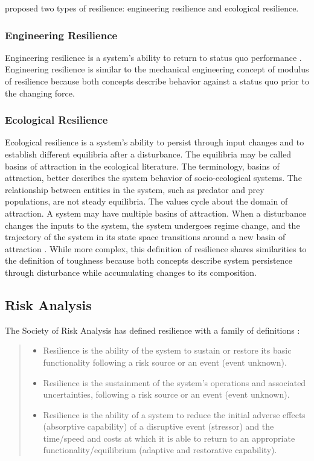\cite{Holling1973a} proposed two types of resilience: engineering
resilience and ecological resilience.

\subsubsection{Engineering Resilience}
Engineering resilience is a system's ability to return to status quo
performance \cite{Holling2010}. Engineering resilience is similar to
the mechanical engineering concept of modulus of resilience because
both concepts describe behavior against a status quo prior to the
changing force.

\subsubsection{Ecological Resilience}
Ecological resilience is a system's ability to persist through input
changes and to establish different equilibria after a disturbance. The
equilibria may be called basins of attraction in the ecological
literature. The terminology, basins of attraction, better describes
the system behavior of socio-ecological systems. The relationship
between entities in the system, such as predator and prey populations,
are not steady equilibria. The values cycle about the domain of
attraction. A system may have multiple basins of attraction. When a
disturbance changes the inputs to the system, the system undergoes
regime change, and the trajectory of the system in its state space
transitions around a new basin of attraction \cite{Folke2010a}. While
more complex, this definition of resilience shares similarities to the
definition of toughness because both concepts describe system
persistence through disturbance while accumulating changes to its
composition.

\subsection{Risk Analysis}
The Society of Risk Analysis has defined resilience with a family of
definitions \cite{Aven2015b}:
\begin{quotation}
  \begin{itemize}
    \item Resilience is the ability of the system to sustain or
      restore its basic functionality following a risk source or an
      event (event unknown).
    \item Resilience is the sustainment of the system's operations
      and associated uncertainties, following a risk source or an
      event (event unknown).
    \item Resilience is the ability of a system to reduce the initial
      adverse effects (absorptive capability) of a disruptive event
      (stressor) and the time/speed and costs at which it is able to
      return to an appropriate functionality/equilibrium (adaptive and
      restorative capability).
  \end{itemize}
\end{quotation}

